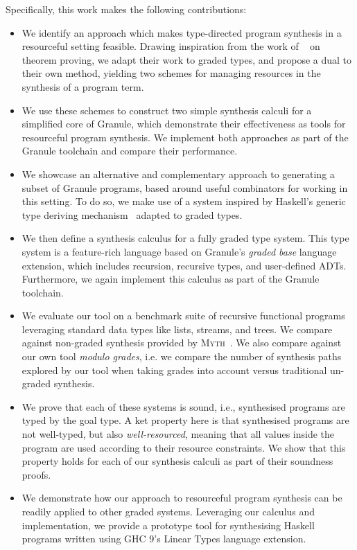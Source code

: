 Specifically, this work makes the following contributions:
\begin{itemize}
  \item We identify an approach which makes type-directed program synthesis in
        a resourceful setting feasible. Drawing inspiration from the work of
        ~\citet{HODAS1994327} on theorem proving, we adapt their
        work to graded types, and propose a dual to their own method, yielding two
        schemes for managing resources in the
        synthesis of a program term. 

  \item We use these schemes to construct two simple synthesis calculi for a
        simplified core of Granule, which demonstrate their effectiveness as
        tools for resourceful program synthesis. We implement both approaches as 
        part of the Granule toolchain and compare their performance.

  \item We showcase an alternative and complementary approach to generating a
        subset of Granule programs, based around useful combinators for working
        in this setting. To do so, we make use of a system inspired by Haskell's
        generic type deriving mechanism~\citep{generic-deriving} adapted to
        graded types.

  \item We then define a synthesis calculus for a fully graded type system. This
        type system is a feature-rich language based on Granule's \emph{graded
        base} language extension, which includes recursion, recursive types, and
        user-defined ADTs. Furthermore, we again implement this calculus as part
        of the Granule toolchain.

  \item We evaluate our tool on a benchmark suite of recursive functional
        programs leveraging standard data types like lists, streams, and trees.
        We compare against non-graded synthesis provided by
        \textsc{Myth}~\citep{oseraMYTH1}. We also compare against our own tool
        \emph{modulo grades}, i.e. we compare the number of synthesis paths
        explored by our tool when taking grades into account versus traditional
        un-graded synthesis.

  \item We prove that each of these systems is sound, i.e., synthesised programs
        are typed by the goal type. A ket property here is that synthesised programs 
        are not well-typed, but also \emph{well-resourced}, meaning that all values  
        inside the program are used according to their resource constraints. We
        show that this property holds for each of our synthesis calculi as part
        of their soundness proofs. 

  \item We demonstrate how our approach to resourceful program synthesis can be
        readily applied to other graded systems. Leveraging our calculus and
        implementation, we provide a prototype tool for synthesising Haskell
        programs written using GHC 9's Linear Types language extension.
\end{itemize}
